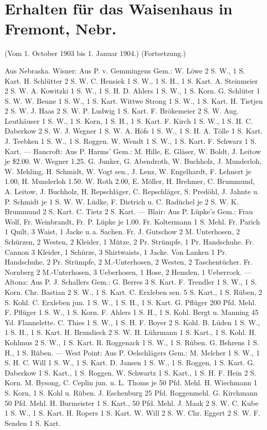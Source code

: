 \chapter[Erhalten für das Waisenhaus in …]{Erhalten für das Waisenhaus in Fremont, Nebr.}

(Vom 1. October 1903 bis 1. Januar 1904.) (Fortsetzung.)

Aus Nebraska. Wisner: Aus P. v. Gemmingens Gem.: W. Löwe 2 S. W., 1 S. Kart. H. Schlütter 2 S. W. C. Hensiek 1 S. W., 1 S. H., 1 S. Kart. A. Steinmeier 2 S. W. A. Kowitzki 1 S. W., 1 S. H. D. Ahlers 1 S. W., 1 S. Korn. G. Schlüter 1 S. W. W. Beune 1 S. W., 1 S. Kart. Wittwe Strong 1 S. W., 1 S. Kart. H. Tietjen 2 S. W. J. Haas 2 S. W. P. Ludwig 1 S. Kart. F. Brökemeier 2 S. W. Aug. Leuthäuser 1 S. W., 1 S. Korn, 1 S. H., 1 S. Kart. F. Kirch 1 S. W., 1 S. H. C. Daberkow 2 S. W. J. Wegner 1 S. W. A. Höfs 1 S. W., 1 S. H. A. Tölle 1 S. Kart. J. Teebken 1 S. W., 1 S. Roggen. W. Wendt 1 S. W., 1 S. Kart. F. Schwarz 1 S. Kart. — Bancroft: Aus P. Harms' Gem.: M. Hille, E. Gläser, W. Boldt, J. Leitow je \$2.00. W. Wegner 1.25. G. Junker, G. Abendroth, W. Buchholz, J. Munderloh, W. Mehling, H. Schmidt, W. Vogt sen., J. Lenz, W. Engelhardt, F. Lehnert je 1.00, H. Munderloh 1.50. W. Roth 2.00, E. Möller, H. Brehmer, C. Brummund, A. Leitow, J. Buchholz, H. Repschläger, C. Repschläger, S. Predöhl, J. Jahnte u. P. Schmidt je 1 S. W. W. Lüdke, F. Dietrich u. C. Radüchel je 2 S. W. K. Brummund 2 S. Kart. C. Tietz 2 S. Kart. — Blair: Aus P. Lüpke's Gem.: Frau Wolf, Fr. Weinbrandt, Fr. P. Lüpke je 1.00. Fr. Koltermann 1 S. Mehl. Fr. Parich 1 Quilt, 3 Waist, 1 Jacke u.\,a. Sachen. Fr. J. Gutschow 2 M. Unterhosen, 2 Schürzen, 2 Westen, 2 Kleider, 1 Mütze, 2 Pr. Strümpfe, 1 Pr. Handschuhe. Fr. Cannon 3 Kleider, 1 Schürze, 3 Shirtwaists, 1 Jacke. Von Lanken 1 Pr. Handschuhe, 2 Pr. Strümpfe, 2 M.-Unterhosen, 2 Westen, 2 Taschentücher. Fr. Nornberg 2 M.-Unterhosen, 3 Ueberhosen, 1 Hose, 2 Hemden, 1 Ueberrock. — Altona: Aus P. J. Schallers Gem.: G. Berres 3 S. Kart. F. Trendler 1 S. W., 1 S. Korn. Chr. Bastian 2 S. W., 1 S. Kart. C. Erxleben sen. 5 S. Kart., 1 S. Rüben, 2 S. Kohl. C. Erxleben jun. 1 S. W., 1 S. H., 1 S. Kart. G. Pflüger 200 Pfd. Mehl. F. Pflüger 1 S. W., 1 S. Korn. F. Ahlers 1 S. H., 1 S. Kohl. Bergt u. Manning 45 Yd. Flannelette. C. Thies 1 S. W., 1 S. H. F. Boyer 2 S. Kohl.
B. Lüden 1 S. W., 1 S. H., 1 S. Kart. H. Brundieck 2 S. W. H. Lührmann 1 S. Kart., 1 S. Kohl. H. Kohlmus 2 S. W., 1 S. Kart. R. Roggenack 1 S. W., 1 S. Rüben. G. Behrens 1 S. H., 1 S. Rüben. — West Point: Aus P. Oelschlägers Gem.: M. Melcher 1 S. W., 1 S. H. C. Will 1 S. W., 1 S. Kart. D. Jansen 1 S. W., 1 S. Roggen, 1 S. Kart. G. Daberkow 1 S. Kart., 1 S. Roggen. W. Schwartz 1 S. Kart., 1 S. H. F. Hein 2 S. Korn. M. Bysong, C. Ceplin jun. u. L. Thoms je 50 Pfd. Mehl. H. Wiechmann 1 S. Korn, 1 S. Kohl u. Rüben. J. Eschenburg 25 Pfd. Roggenmehl. G. Kirchmann 50 Pfd. Mehl. H. Burmeister 1 S. Kart., 50 Pfd. Mehl. J. Maak 2 S. W. C. Kube 1 S. W., 1 S. Kart. H. Ropers 1 S. Kart. W. Will 2 S. W. Chr. Eggert 2 S. W. F. Senden 1 S. Kart.


